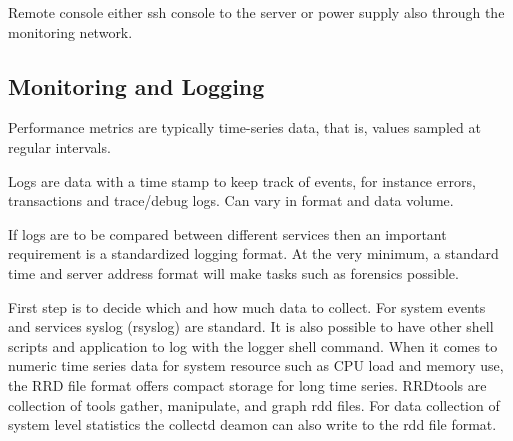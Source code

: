 \documentclass[12pt,a4paper]{article}
\begin{document}




Remote console
either ssh console to the server or power supply also through the monitoring network.



\subsection{Monitoring and Logging} \label{ssec:logging}


%
Performance metrics are typically time-series data, that is, values sampled at regular intervals. 

Logs are data with a time stamp to keep track of events, for instance errors, transactions and trace/debug logs. Can vary in format and data volume.

If logs are to be compared between different services then an important requirement is a standardized logging format. 
At the very minimum, a standard time and server address format will make tasks such as forensics possible.

First step is to decide which and how much data to collect. For system events and services syslog (rsyslog) are standard. 
It is also possible to have other shell scripts and application to log with the logger shell command. 
When it comes to numeric time series data for system resource such as CPU load and memory use, the RRD file format offers compact storage for long time series. 
RRDtools are collection of tools gather, manipulate, and graph rdd files. 
For data collection of system level statistics the collectd deamon can also write to the rdd file format.
\end{document}
